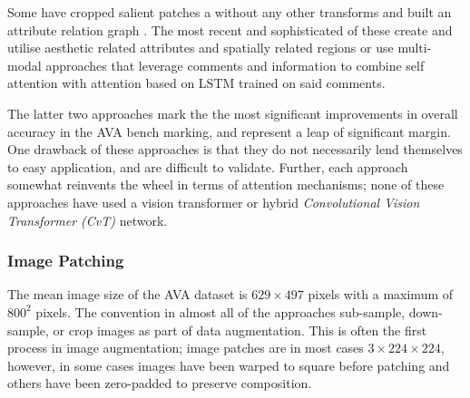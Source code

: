 Some have cropped salient patches a without any other transforms and built an attribute relation graph \cite{Ma2017}. The most recent and sophisticated of these create and utilise aesthetic related attributes and spatially related regions\cite{She_2021_CVPR} or use multi-modal approaches\cite{Zhang2021d} that leverage comments and information to combine self attention with attention based on LSTM trained on said comments. 

The latter two approaches mark the the most significant improvements in overall accuracy in the AVA bench marking, and represent a leap of significant margin. One drawback of these approaches is that they do not necessarily lend themselves to easy application, and are difficult to validate. Further, each approach somewhat reinvents the wheel in terms of attention mechanisms; none of these approaches have used a vision transformer or hybrid \textit{Convolutional Vision Transformer (CvT)} network.  

\subsubsection{Image Patching}
\label{sec:image patching}
The mean image size of the AVA dataset is $629 \times 497$ pixels with a maximum of $800^2$ pixels. The convention in almost all of the approaches sub-sample, down-sample, or crop images as part of data augmentation. This is often the first process in image augmentation; image patches are in most cases $3\times224\times224$, however, in some cases images have been warped to square before patching \cite{She_2021_CVPR} and others have been zero-padded to preserve composition. 


